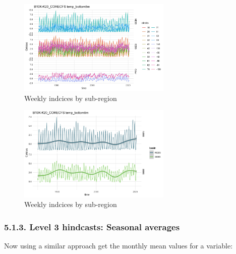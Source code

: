 \documentclass[
]{article}
\begin{document}
\begin{figure}
\centering
\includegraphics[width=0.65\textwidth,height=\textheight]{Figs/hind_weekly_bystrata.jpg}
\caption{Weekly indcices by sub-region}
\end{figure}

\begin{figure}
\centering
\includegraphics[width=0.65\textwidth,height=\textheight]{Figs/hind_weekly_byreg.jpg}
\caption{Weekly indcices by sub-region}
\end{figure}

\hypertarget{level-3-hindcasts-seasonal-averages}{%
\subsubsection{5.1.3. Level 3 hindcasts: Seasonal
averages}\label{level-3-hindcasts-seasonal-averages}}

Now using a similar approach get the monthly mean values for a variable:
\end{document}
